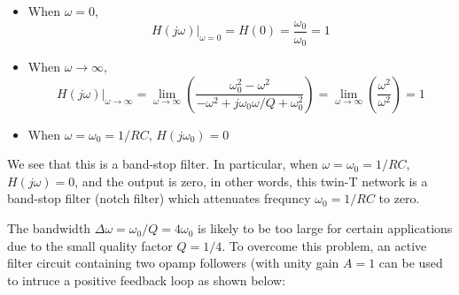 \begin{itemize}
\item When $\omega=0$, 
  \[
  H(j\omega)\big|_{\omega=0}=H(0)=\frac{\omega_0}{\omega_0}=1
  \]
\item When $\omega\rightarrow \infty$, 
  \[
  H(j\omega)\big|_{\omega\rightarrow\infty}=\lim\limits_{\omega\rightarrow\infty}
  \left( \frac{\omega_0^2-\omega^2}{-\omega^2+j\omega_0\omega/Q+\omega_0^2} \right)
  =\lim\limits_{\omega\rightarrow\infty}\left(\frac{\omega^2}{\omega^2}\right)=1
  \]
\item When $\omega=\omega_0=1/RC$, $H(j\omega_0)=0$
\end{itemize}
We see that this is a band-stop filter. In particular, when
$\omega=\omega_0=1/RC$, $H(j\omega)=0$, and the output is zero, in other
words, this twin-T network is a band-stop filter (notch filter) which 
attenuates frequncy $\omega_0=1/RC$ to zero.

The bandwidth $\Delta\omega=\omega_0/Q=4\omega_0$ is likely to be too large 
for certain applications due to the small quality factor $Q=1/4$. To overcome 
this problem, an active filter circuit containing two opamp followers (with
unity gain $A=1$ can be used to intruce a positive feedback loop as shown below:



